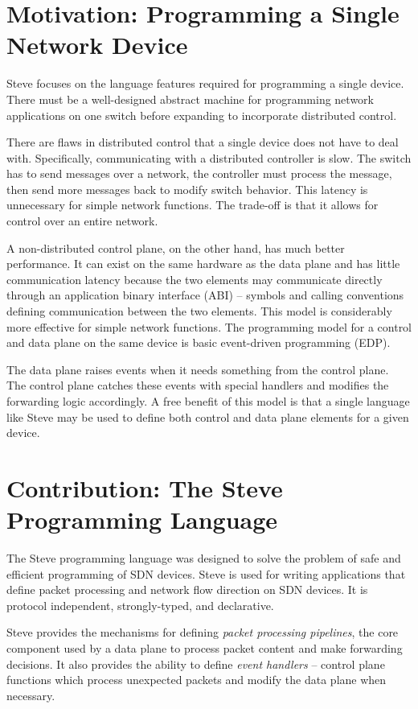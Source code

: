 \section{Motivation: Programming a Single Network Device}

Steve focuses on the language features required for programming a single device. There must be a well-designed abstract machine for programming network applications on one switch before expanding to incorporate distributed control.

There are flaws in distributed control that a single device does not have to deal with.
Specifically, communicating with a distributed controller is slow.
The switch has to send messages over a network, the controller must process the message, then send more messages back to modify switch behavior. This latency is unnecessary for simple network functions.
The trade-off is that it allows for control over an
entire network.

A non-distributed control plane, on the other hand, has much
better performance.
It can exist on the
same hardware as the data plane and has little communication latency
because the two elements may communicate directly through an application
binary interface (ABI) -- symbols and calling conventions defining communication between the two elements.
This model is considerably more effective for simple network functions.
The programming model for a control and data plane on the same device
is basic event-driven programming (EDP).

The data plane raises events when it needs something from the control plane.
The control plane catches these events with special handlers and modifies the
forwarding logic accordingly.
A free benefit of this model is that a single language like Steve may
be used to define both control and data plane elements for a given 
device. 
 
\section{Contribution: The Steve Programming Language}

The Steve programming language was designed to solve the problem of safe and efficient programming of SDN devices.
Steve is used for writing applications that define packet processing and network flow direction on SDN devices.
It is protocol independent, strongly-typed,
and declarative.

Steve provides the mechanisms for defining \emph{packet
processing pipelines}, the core component used by a data plane
to process packet content and make forwarding decisions.
It also provides the ability to define \emph{event handlers} --
control plane functions which process unexpected packets and
modify the data plane when necessary.


